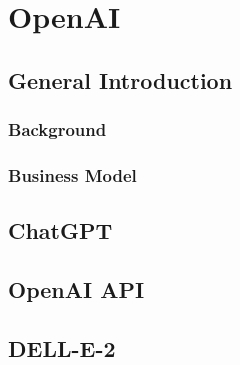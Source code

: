 \chapter{OpenAI} \label{ch:openai}

\section{General Introduction}

\subsection{Background}

\subsection{Business Model}

\section{ChatGPT}

\section{OpenAI API}

\section{DELL-E-2}

